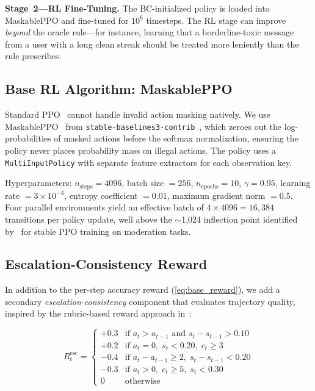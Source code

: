 \documentclass[journal]{IEEEtran}
\begin{document}
\textbf{Stage~2---RL Fine-Tuning.} The BC-initialized policy is loaded into MaskablePPO
and fine-tuned for $10^6$ timesteps. The RL stage can improve \emph{beyond} the oracle
rule---for instance, learning that a borderline-toxic message from a user with a long
clean streak should be treated more leniently than the rule prescribes.

\subsection{Base RL Algorithm: MaskablePPO}

Standard PPO~\cite{schulman2017ppo} cannot handle invalid action masking natively.
We use MaskablePPO~\cite{huang2022mask} from \texttt{stable-baselines3-contrib}~\cite{raffin2021sb3},
which zeroes out the log-probabilities of masked actions before the softmax normalization,
ensuring the policy never places probability mass on illegal actions. The policy uses a
\texttt{MultiInputPolicy} with separate feature extractors for each observation key.

Hyperparameters: $n_{\text{steps}} = 4096$, batch size $= 256$, $n_{\text{epochs}} = 10$,
$\gamma = 0.95$, learning rate $= 3 \times 10^{-4}$, entropy coefficient $= 0.01$,
maximum gradient norm $= 0.5$. Four parallel environments yield an effective batch of
$4 \times 4096 = 16{,}384$ transitions per policy update, well above the $\sim$1,024
inflection point identified by~\cite{liu2025meta} for stable PPO training on moderation
tasks.

\subsection{Escalation-Consistency Reward}

In addition to the per-step accuracy reward (\ref{eq:base_reward}), we add a secondary
\textit{escalation-consistency} component that evaluates trajectory quality, inspired by
the rubric-based reward approach in~\cite{liu2025meta}:

\begin{equation}\label{eq:esc_reward}
  R^{\text{esc}}_t =
  \begin{cases}
    +0.3 & \text{if } a_t > a_{t-1} \text{ and } s_t - s_{t-1} > 0.10 \\
    +0.2 & \text{if } a_t = 0,\; s_t < 0.20,\; c_t \geq 3 \\
    -0.4 & \text{if } a_t - a_{t-1} \geq 2,\; s_t - s_{t-1} < 0.20 \\
    -0.3 & \text{if } a_t > 0,\; c_t \geq 5,\; s_t < 0.30 \\
    0    & \text{otherwise}
  \end{cases}
\end{equation}
\end{document}
